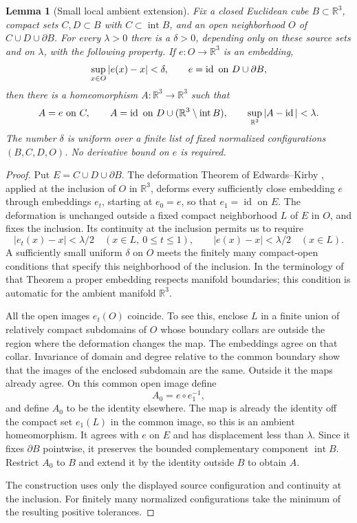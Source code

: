 \documentclass[11pt]{article}
\numberwithin{equation}{section}
\newtheorem{lemma}[theorem]{Lemma}
\theoremstyle{definition}
\theoremstyle{remark}
\begin{document}
\begin{lemma}[Small local ambient extension]
\label{sm:local-extension}
Fix a closed Euclidean cube $B\subset\mathbb R^3$, compact sets $C,D\subset B$
with $C\subset\operatorname{int}B$, and an open neighborhood $O$ of
$C\cup D\cup\partial B$.  For every $\lambda>0$ there is a
$\delta>0$, depending only on these source sets and on $\lambda$,
with the following property.  If $e:O\to\mathbb R^3$ is an embedding,
\[
 \sup_{x\in O}|e(x)-x|<\delta,
 \qquad e=\operatorname{id}\ \hbox{on }D\cup\partial B,
\]
then there is a homeomorphism $A:\mathbb R^3\to\mathbb R^3$ such that
\begin{equation}
 \label{sm:extension-conclusion}
 A=e\ \hbox{on }C,\qquad
 A=\operatorname{id}\ \hbox{on }D\cup(\mathbb R^3\setminus\operatorname{int}B),
 \qquad \sup_{\mathbb R^3}|A-\operatorname{id}|<\lambda.
\end{equation}
The number $\delta$ is uniform over a finite list of fixed normalized
configurations $(B,C,D,O)$.  No derivative bound on $e$ is required.
\end{lemma}

\begin{proof}
Put $E=C\cup D\cup\partial B$.  The deformation Theorem of
Edwards--Kirby \cite[Theorem~5.1]{EdwardsKirby1971}, applied at the
inclusion of $O$ in $\mathbb R^3$, deforms every sufficiently close embedding
$e$ through embeddings $e_t$, starting at $e_0=e$, so that
$e_1=\operatorname{id}$ on $E$.  The deformation is unchanged outside a fixed
compact neighborhood $L$ of $E$ in $O$, and fixes the inclusion.
Its continuity at the inclusion permits us to require
\[
 |e_t(x)-x|<\lambda/2\quad(x\in L,\ 0\le t\le1),
 \qquad |e(x)-x|<\lambda/2\quad(x\in L).
\]
A sufficiently small uniform $\delta$ on $O$ meets the finitely many
compact-open conditions that specify this neighborhood of the
inclusion.  In the terminology of that Theorem a proper embedding
respects manifold boundaries; this condition is automatic for the
ambient manifold $\mathbb R^3$.

All the open images $e_t(O)$ coincide.  To see this, enclose $L$ in a
finite union of relatively compact subdomains of $O$ whose boundary collars are outside
the region where the deformation changes the map.  The embeddings
agree on that collar. Invariance of domain
\cite[Theorem~2B.3]{Hatcher2002} and degree relative to
the common boundary show that the images of the enclosed subdomain
are the same.  Outside it the maps already agree.
On this common open image define
\[
 A_0=e\circ e_1^{-1},
\]
and define $A_0$ to be the identity elsewhere.  The map is already
the identity off the compact set $e_1(L)$ in the common image, so
this is an ambient homeomorphism.  It agrees with $e$ on $E$ and has
displacement less than $\lambda$.  Since it fixes $\partial B$
pointwise, it preserves the bounded complementary component
$\operatorname{int}B$.  Restrict $A_0$ to $B$ and extend it by the
identity outside $B$ to obtain $A$.

The construction uses only the displayed source configuration and
continuity at the inclusion.  For finitely many normalized
configurations take the minimum of the resulting positive tolerances.
\end{proof}
\end{document}
